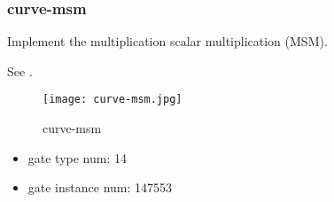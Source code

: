 \subsubsection{curve-msm}

Implement the multiplication scalar multiplication (MSM).

See .
\begin{figure}[!ht]
    \centering
    \texttt{[image: curve-msm.jpg]}
    \caption{curve-msm}
    \label{fig:curve-msm}
\end{figure}

\begin{itemize}
    \item gate type num: 14
    \item gate instance num: 147553
\end{itemize}
